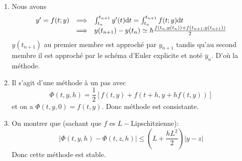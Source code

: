 \documentclass[a4paper]{article}
\def \de {{\rm d}}
\begin{document}
\begin{enumerate}
\item  Nous avons 
\[\begin{array}{ccl}
y' = f(t; y) &\Longrightarrow &\int_{t_n}^{t_{n+1}} y'(t)\de t  = \int_{t_n}^{t_{n+1}} f(t; y) \de t\\
               &\Longrightarrow &y(t_{n+1})-y(t_n)  \simeq h\frac{f(t_n,y(t_n))+f(t_{n+1},y(t_{n+1})) }{2}
\end{array} \]
$y(t_{n+1})$ au premier membre est approché par $y_{n+1}$ tandis qu'au second membre il est approché par le schéma d'Euler explicite et noté $\overline{y}_{n}$. D'où la méthode.

\item   Il s'agit d'une méthode à un pas avec
\[\Phi(t,y,h)=\frac 12\left[f(t,y)+f(t+h,y+h f(t,y))\right]\]
et on a $\Phi(t,y,0)=f(t,y)$. Donc méthode est consistante.
\item  On montrer que (sachant que $f$ es $L-$Lipschitzienne):
\[|\Phi(t,y,h)-\Phi(t,z,h)|\leq (L+\frac{hL^2}{2})|y-z|\]
Donc cette méthode est stable.
\end{enumerate}




%
\end{document}
